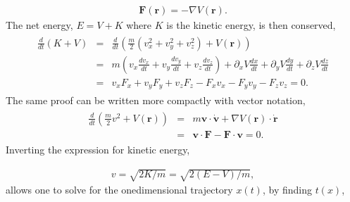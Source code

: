 \documentclass[letterpaper,10pt,english]{sphinxmanual}
\begin{document}
\begin{equation*}
\begin{split}
\begin{equation}
\boldsymbol{F}(\boldsymbol{r})=-\nabla V(\boldsymbol{r}).
\label{_auto1} \tag{1}
\end{equation}
\end{split}
\end{equation*}
The net energy, \(E=V+K\) where \(K\) is the kinetic energy, is then conserved,
\begin{equation*}
\begin{split}
\begin{eqnarray}
\frac{d}{dt}(K+V)&=&\frac{d}{dt}\left(\frac{m}{2}(v_x^2+v_y^2+v_z^2)+V(\boldsymbol{r})\right)\\
\nonumber
&=&m\left(v_x\frac{dv_x}{dt}+v_y\frac{dv_y}{dt}+v_z\frac{dv_z}{dt}\right)
+\partial_xV\frac{dx}{dt}+\partial_yV\frac{dy}{dt}+\partial_zV\frac{dz}{dt}\\
\nonumber
&=&v_xF_x+v_yF_y+v_zF_z-F_xv_x-F_yv_y-F_zv_z=0.
\end{eqnarray}
\end{split}
\end{equation*}
The same proof can be written more compactly with vector notation,
\begin{equation*}
\begin{split}
\begin{eqnarray}
\frac{d}{dt}\left(\frac{m}{2}v^2+V(\boldsymbol{r})\right)
&=&m\boldsymbol{v}\cdot\dot{\boldsymbol{v}}+\nabla V(\boldsymbol{r})\cdot\dot{\boldsymbol{r}}\\
\nonumber
&=&\boldsymbol{v}\cdot\boldsymbol{F}-\boldsymbol{F}\cdot\boldsymbol{v}=0.
\end{eqnarray}
\end{split}
\end{equation*}
Inverting the expression for kinetic energy,




\begin{equation*}
\begin{split}
\begin{equation}
v=\sqrt{2K/m}=\sqrt{2(E-V)/m},
\label{_auto2} \tag{2}
\end{equation}
\end{split}
\end{equation*}
allows one to solve for the one\sphinxhyphen{}dimensional trajectory \(x(t)\), by finding \(t(x)\),
\end{document}
